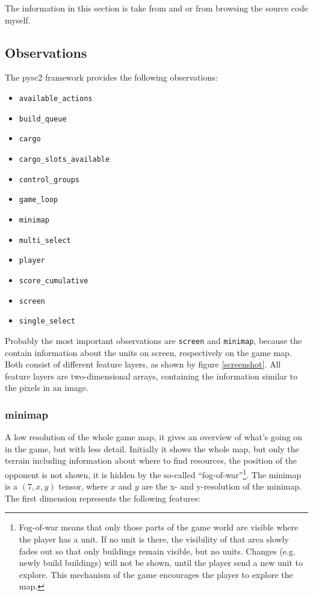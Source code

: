 \documentclass{article}
\begin{document}
The information in this section is take from \cite{Deepmind2017} and 
\cite{Blizzard2017} or from browsing the source code myself.

\subsection{Observations}
The pysc2 framework provides the following observations:

\begin{itemize}[noitemsep]
\item \texttt{available\_actions}
\item \texttt{build\_queue}
\item \texttt{cargo}
\item \texttt{cargo\_slots\_available}
\item \texttt{control\_groups}
\item \texttt{game\_loop}
\item \texttt{minimap}
\item \texttt{multi\_select}
\item \texttt{player}
\item \texttt{score\_cumulative}
\item \texttt{screen}
\item \texttt{single\_select}
\end{itemize}

Probably the most important observations are \texttt{screen} and 
\texttt{minimap}, because the contain information about the units on screen, 
respectively on the game map. Both consist of different feature layers, as 
shown by figure \ref{screenshot}. All feature layers are two-dimensional 
arrays, containing the information similar to the pixels in an image.

\subsubsection{minimap}
A low resolution of the whole game map, it gives an overview of what's going on 
in the game, but with less detail. Initially it shows the whole map, but only 
the terrain including information about where to find resources, the position 
of the opponent is not shown, it is hidden by the so-called 
``fog-of-war''\footnote{Fog-of-war means that only those parts of the game 
world are visible where the player has a unit. If no unit is there, the 
visibility of that area slowly fades out so that only buildings remain visible, 
but no units. Changes (e.g. newly build buildings) will not be shown, until the 
player send a new unit to explore. This mechanism of the game encourages the 
player to explore the map.}. The minimap is a $(7, x,y)$ tensor, where $x$ and 
$y$ are the x- and y-resolution of the minimap. The first dimension represents 
the following features:
\end{document}
